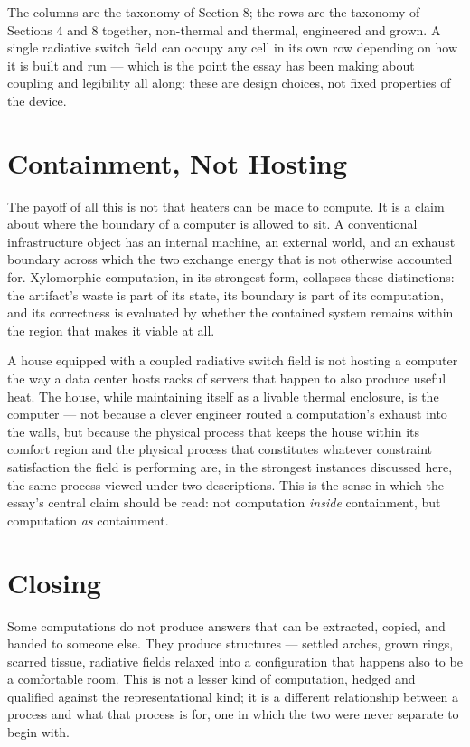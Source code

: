 \documentclass[11pt]{article}
\begin{document}
\noindent The columns are the taxonomy of Section 8; the rows are the taxonomy of Sections 4 and 8 together, non-thermal and thermal, engineered and grown. A single radiative switch field can occupy any cell in its own row depending on how it is built and run --- which is the point the essay has been making about coupling and legibility all along: these are design choices, not fixed properties of the device.

\section{Containment, Not Hosting}

The payoff of all this is not that heaters can be made to compute. It is a claim about where the boundary of a computer is allowed to sit. A conventional infrastructure object has an internal machine, an external world, and an exhaust boundary across which the two exchange energy that is not otherwise accounted for. Xylomorphic computation, in its strongest form, collapses these distinctions: the artifact's waste is part of its state, its boundary is part of its computation, and its correctness is evaluated by whether the contained system remains within the region that makes it viable at all.

A house equipped with a coupled radiative switch field is not hosting a computer the way a data center hosts racks of servers that happen to also produce useful heat. The house, while maintaining itself as a livable thermal enclosure, is the computer --- not because a clever engineer routed a computation's exhaust into the walls, but because the physical process that keeps the house within its comfort region and the physical process that constitutes whatever constraint satisfaction the field is performing are, in the strongest instances discussed here, the same process viewed under two descriptions. This is the sense in which the essay's central claim should be read: not computation \emph{inside} containment, but computation \emph{as} containment.

\section{Closing}

Some computations do not produce answers that can be extracted, copied, and handed to someone else. They produce structures --- settled arches, grown rings, scarred tissue, radiative fields relaxed into a configuration that happens also to be a comfortable room. This is not a lesser kind of computation, hedged and qualified against the representational kind; it is a different relationship between a process and what that process is for, one in which the two were never separate to begin with.
\end{document}
